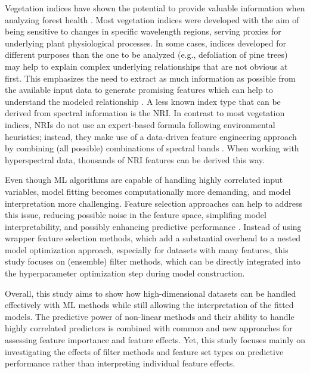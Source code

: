 \documentclass[remotesensing,article,submit,moreauthors,pdftex]{Definitions/mdpi}
\begin{document}
Vegetation indices have shown the potential to provide valuable information when analyzing forest health \cite{jiang2014, adamczyk2015}.
Most vegetation indices were developed with the aim of being sensitive to changes in specific wavelength regions, serving proxies for underlying plant physiological processes.
In some cases, indices developed for different purposes than the one to be analyzed (e.g., defoliation of pine trees) may help to explain complex underlying relationships that are not obvious at first.
This emphasizes the need to extract as much information as possible from the available input data to generate promising features which can help to understand the modeled relationship \cite{thenkabail2018}.
A less known index type that can be derived from spectral information is the \ac{NRI}.
In contrast to most vegetation indices, \ac{NRI}s do not use an expert-based formula following environmental heuristics; instead, they make use of a data-driven feature engineering approach by combining (all possible) combinations of spectral bands \cite{thenkabail2000}.
When working with hyperspectral data, thousands of \ac{NRI} features can be derived this way.

Even though \ac{ML} algorithms are capable of handling highly correlated input variables, model fitting becomes computationally more demanding, and model interpretation more challenging.
Feature selection approaches can help to address this issue, reducing possible noise in the feature space, simplifing model interpretability, and possibly enhancing predictive performance \cite{cai2018}.
Instead of using wrapper feature selection methods, which add a substantial overhead to a nested model optimization approach, especially for datasets with many features, this study focuses on (ensemble) filter methods, which can be directly integrated into the hyperparameter optimization step during model construction.

Overall, this study aims to show how high-dimensional datasets can be handled effectively with ML methods while still allowing the interpretation of the fitted models.
The predictive power of non-linear methods and their ability to handle highly correlated predictors is combined with common and new approaches for assessing feature importance and feature effects.
Yet, this study focuses mainly on investigating the effects of filter methods and feature set types on predictive performance rather than interpreting individual feature effects.
\end{document}
